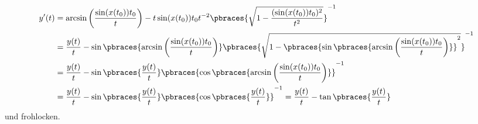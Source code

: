 \begin{solution}
\begin{itemize}
\begin{align*}
    y^\prime(t) &= \arcsin\left(\frac{\sin(x(t_0))t_0}{t}\right) - t \sin(x(t_0))t_0 t^{-2} \pbraces{\sqrt{1 - \frac{(\sin(x(t_0)) t_0)^2}{t^2}}}^{-1} \\
    &= \frac{y(t)}{t} - \sin\pbraces{\arcsin\left(\frac{\sin(x(t_0))t_0}{t}\right)} \pbraces{ \sqrt{1 - \pbraces{\sin\pbraces{\arcsin\left(\frac{\sin(x(t_0))t_0}{t}\right)}}^2} }^{-1} \\
    &= \frac{y(t)}{t} - \sin\pbraces{\frac{y(t)}{t}} \pbraces{\cos\pbraces{\arcsin\left(\frac{\sin(x(t_0))t_0}{t}\right)}}^{-1} \\ 
    &= \frac{y(t)}{t} - \sin\pbraces{\frac{y(t)}{t}} \pbraces{\cos\pbraces{\frac{y(t)}{t}}}^{-1} = \frac{y(t)}{t} - \tan\pbraces{\frac{y(t)}{t}}
  \end{align*}
  und frohlocken.
\end{itemize}
\end{solution}
